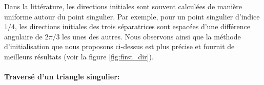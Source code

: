 \begin{remark}
Dans la littérature, les directions initiales sont souvent calculées de manière uniforme autour du point singulier. Par exemple, pour un point singulier d'indice $1/4$, les directions initiales des trois séparatrices sont espacées d'une différence angulaire de $2\pi/3$ les unes des autres. Nous observons ainsi que la méthode d'initialisation que nous proposons ci-dessus est plus précise et fournit de meilleurs résultats (voir la figure \ref{fig:first_dir}).
\end{remark}




\paragraph{Traversé d'un triangle singulier:}

